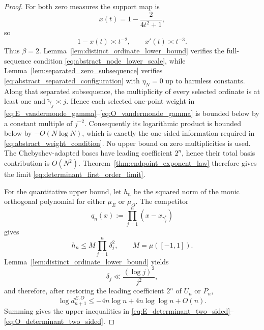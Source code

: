 \documentclass[11pt]{amsart}
\numberwithin{equation}{section}
\theoremstyle{plain}
\theoremstyle{definition}
\theoremstyle{remark}
\begin{document}
\begin{proof}
For both zero measures the support map is
\begin{equation}
x(t)=1-\frac{2}{4t^2+1},
\label{eq:x_of_t_decay}
\end{equation}
so
\begin{equation}
1-x(t)\asymp t^{-2},
\qquad
x'(t)\asymp t^{-3}.
\label{eq:zeta_endpoint_beta_two}
\end{equation}
Thus $\beta=2$. Lemma~\ref{lem:distinct_ordinate_lower_bound} verifies the full-sequence condition \eqref{eq:abstract_node_lower_scale}, while Lemma~\ref{lem:separated_zero_subsequence} verifies \eqref{eq:abstract_separated_configuration} with $\eta_N=0$ up to harmless constants. Along that separated subsequence, the multiplicity of every selected ordinate is at least one and \(\widetilde\gamma_j\asymp j\).  Hence each selected one-point weight in \eqref{eq:E_vandermonde_gamma}--\eqref{eq:O_vandermonde_gamma} is bounded below by a constant multiple of \(j^{-2}\).  Consequently its logarithmic product is bounded below by \(-O(N\log N)\), which is exactly the one-sided information required in \eqref{eq:abstract_weight_condition}.  No upper bound on zero multiplicities is used. The Chebyshev-adapted bases have leading coefficient $2^n$, hence their total basis contribution is $O(N^2)$. Theorem~\ref{thm:endpoint_exponent_law} therefore gives the limit \eqref{eq:determinant_first_order_limit}.

For the quantitative upper bound, let $h_n$ be the squared norm of the monic orthogonal polynomial for either $\mu_E$ or $\mu_O$. The competitor
\begin{equation}
q_n(x):=\prod_{j=1}^{n}(x-x_{\gamma_j^*})
\label{eq:extremal_competitor}
\end{equation}
gives
\begin{equation}
h_n\le M\prod_{j=1}^{n}\delta_j^2,
\qquad M=\mu([-1,1]).
\label{eq:monic_norm_upper_bound}
\end{equation}
Lemma~\ref{lem:distinct_ordinate_lower_bound} yields
\begin{equation}
\delta_j\ll\frac{(\log j)^2}{j^2},
\label{eq:delta_upper_RVM}
\end{equation}
and therefore, after restoring the leading coefficient $2^n$ of $U_n$ or $P_n$,
\begin{equation}
\log d_{n+1}^{E,O}
\le -4n\log n+4n\log\log n+O(n).
\label{eq:pivot_upper_asymptotic}
\end{equation}
Summing gives the upper inequalities in \eqref{eq:E_determinant_two_sided}--\eqref{eq:O_determinant_two_sided}.


\end{proof}
\end{document}
